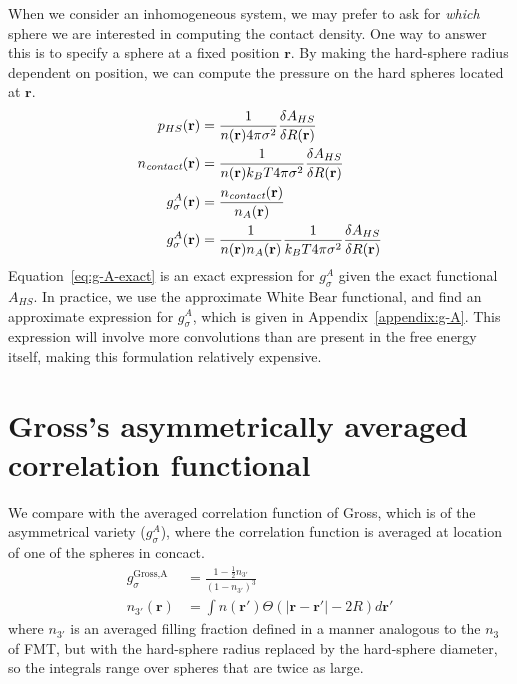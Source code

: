 \documentclass[letterpaper,twocolumn,amsmath,amssymb,jcp,10pt,aip]{revtex4-1}
\newcommand{\rr}{\textbf{r}}
\newcommand{\derivation}[1]{} %
\begin{document}
When we consider an inhomogeneous system, we may prefer to ask for
\emph{which} sphere we are interested in computing the contact
density.  One way to answer this is to specify a sphere at a fixed
position $\mathbf{r}$.  By making the hard-sphere radius dependent on
position, we can compute the pressure on the hard spheres located at
$\mathbf{r}$.
\begin{align}
  p_{HS}(\mathbf{r}) &= \frac{1}{n(\rr) 4\pi \sigma^2} \frac{\delta
    A_{HS}}{\delta R(\mathbf{r})} \label{eq:p_{HS}^A}\\
  \ncontact(\rr) &= \frac{1}{n(\rr) k_BT 4\pi \sigma^2} \frac{\delta
    A_{HS}}{\delta R(\mathbf{r})} \\
  g_\sigma^A(\rr) &= \frac{\ncontact(\rr)}{n_A(\rr)} \\
  g_\sigma^A(\rr) &= \frac{1}{n(\rr) n_A(\rr)}\frac{1}{ k_BT 4\pi \sigma^2} \frac{\delta
    A_{HS}}{\delta R(\mathbf{r})} \label{eq:g-A-exact}
\end{align}
Equation~\ref{eq:g-A-exact} is an exact expression for $g_\sigma^A$
given the exact functional $A_{HS}$.  In practice, we use the
approximate White Bear functional, and find an approximate expression
for $g_\sigma^A$, which is given in Appendix~\ref{appendix:g-A}.  This
expression will involve more convolutions than are present in the free
energy itself, making this formulation relatively expensive.


\derivation{
  \end{widetext}
}

\section{Gross's asymmetrically averaged correlation functional}\label{sec:gross}
We compare with the averaged correlation function of
Gross\cite{gross2009density}, which is of the asymmetrical variety
($g_\sigma^A$), where the correlation function is averaged at location
of one of the spheres in concact.
\begin{align}
  g_\sigma^\text{Gross,A} &= \frac{1 - \frac12 n_{3'}}{\left(1 -
    n_{3'}\right)^3} \\
  n_{3'}(\rr) &= \int n(\rr')\Theta(|\rr-\rr'| - 2R) d\rr'
\end{align}
where $n_{3'}$ is an averaged
filling fraction defined in a manner analogous to the $n_3$ of FMT,
but with the hard-sphere radius replaced by the hard-sphere diameter,
so the integrals range over spheres that are twice as large.
\end{document}
